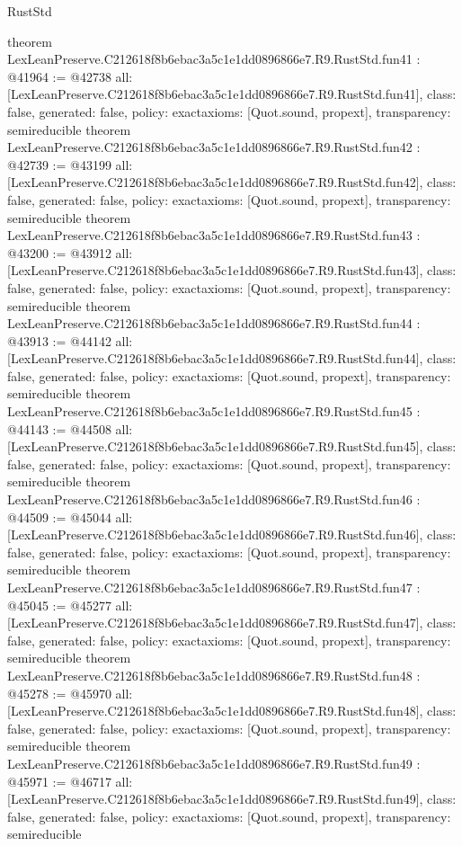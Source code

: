 \begin{lexlean}{RustStd}
\begin{coremodule}
{}
theorem LexLeanPreserve.C212618f8b6ebac3a5c1e1dd0896866e7.R9.RustStd.fun41 : @41964 := @42738 {
  all: [LexLeanPreserve.C212618f8b6ebac3a5c1e1dd0896866e7.R9.RustStd.fun41],
  class: false,
  generated: false,
  policy: exact{axioms: [Quot.sound, propext]},
  transparency: semireducible
}
theorem LexLeanPreserve.C212618f8b6ebac3a5c1e1dd0896866e7.R9.RustStd.fun42 : @42739 := @43199 {
  all: [LexLeanPreserve.C212618f8b6ebac3a5c1e1dd0896866e7.R9.RustStd.fun42],
  class: false,
  generated: false,
  policy: exact{axioms: [Quot.sound, propext]},
  transparency: semireducible
}
theorem LexLeanPreserve.C212618f8b6ebac3a5c1e1dd0896866e7.R9.RustStd.fun43 : @43200 := @43912 {
  all: [LexLeanPreserve.C212618f8b6ebac3a5c1e1dd0896866e7.R9.RustStd.fun43],
  class: false,
  generated: false,
  policy: exact{axioms: [Quot.sound, propext]},
  transparency: semireducible
}
theorem LexLeanPreserve.C212618f8b6ebac3a5c1e1dd0896866e7.R9.RustStd.fun44 : @43913 := @44142 {
  all: [LexLeanPreserve.C212618f8b6ebac3a5c1e1dd0896866e7.R9.RustStd.fun44],
  class: false,
  generated: false,
  policy: exact{axioms: [Quot.sound, propext]},
  transparency: semireducible
}
theorem LexLeanPreserve.C212618f8b6ebac3a5c1e1dd0896866e7.R9.RustStd.fun45 : @44143 := @44508 {
  all: [LexLeanPreserve.C212618f8b6ebac3a5c1e1dd0896866e7.R9.RustStd.fun45],
  class: false,
  generated: false,
  policy: exact{axioms: [Quot.sound, propext]},
  transparency: semireducible
}
theorem LexLeanPreserve.C212618f8b6ebac3a5c1e1dd0896866e7.R9.RustStd.fun46 : @44509 := @45044 {
  all: [LexLeanPreserve.C212618f8b6ebac3a5c1e1dd0896866e7.R9.RustStd.fun46],
  class: false,
  generated: false,
  policy: exact{axioms: [Quot.sound, propext]},
  transparency: semireducible
}
theorem LexLeanPreserve.C212618f8b6ebac3a5c1e1dd0896866e7.R9.RustStd.fun47 : @45045 := @45277 {
  all: [LexLeanPreserve.C212618f8b6ebac3a5c1e1dd0896866e7.R9.RustStd.fun47],
  class: false,
  generated: false,
  policy: exact{axioms: [Quot.sound, propext]},
  transparency: semireducible
}
theorem LexLeanPreserve.C212618f8b6ebac3a5c1e1dd0896866e7.R9.RustStd.fun48 : @45278 := @45970 {
  all: [LexLeanPreserve.C212618f8b6ebac3a5c1e1dd0896866e7.R9.RustStd.fun48],
  class: false,
  generated: false,
  policy: exact{axioms: [Quot.sound, propext]},
  transparency: semireducible
}
theorem LexLeanPreserve.C212618f8b6ebac3a5c1e1dd0896866e7.R9.RustStd.fun49 : @45971 := @46717 {
  all: [LexLeanPreserve.C212618f8b6ebac3a5c1e1dd0896866e7.R9.RustStd.fun49],
  class: false,
  generated: false,
  policy: exact{axioms: [Quot.sound, propext]},
  transparency: semireducible
}
\end{coremodule}
\end{lexlean}
